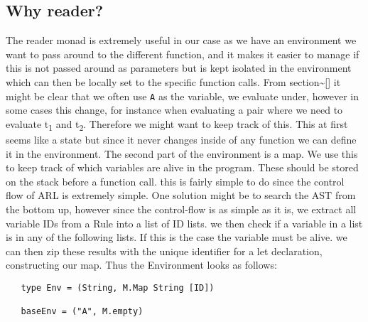 \documentclass[a4paper]{article}
\begin{document}
\subsection{Why reader?}
\label{sec:org763fa06}
The reader monad is extremely useful in our case as we have an environment we want to pass around to the different function, and it makes it easier to manage if this is not passed around as parameters but is kept isolated in the environment which can then be locally set to the specific function calls. From section\textasciitilde{}\ref{} it might be clear that we often use \texttt{A} as the variable, we evaluate under, however in some cases this change, for instance when evaluating a pair where we need to evaluate t\textsubscript{1} and t\textsubscript{2}. Therefore we might want to keep track of this. This at first seems like a state but since it never changes inside of any function we can define it in the environment. The second part of the environment is a map. We use this to keep track of which variables are alive in the program. These should be stored on the stack before a function call. this is fairly simple to do since the control flow of ARL is extremely simple. One solution might be to search the AST from the bottom up, however since the control-flow is as simple as it is, we extract all variable IDs from a Rule into a list of ID lists. we then check if a variable in a list is in any of the following lists. If this is the case the variable must be alive. we can then zip these results with the unique identifier for a let declaration, constructing our map. Thus the Environment looks as follows:
\begin{verbatim}
   type Env = (String, M.Map String [ID])

   baseEnv = ("A", M.empty)
\end{verbatim}
\end{document}
